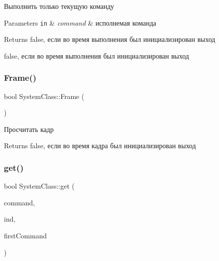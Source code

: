 Выполнить только текущую команду 


\begin{DoxyParams}[1]{Parameters}
\mbox{\tt in}  & {\em command} & исполнемая команда \\
\hline
\end{DoxyParams}
\begin{DoxyReturn}{Returns}
false, если во время выполнения был инициализирован выход 

false, если во время выполнения был инициализирован выход 
\end{DoxyReturn}
\mbox{\label{class_system_class_a19c44b1a6374453ad8735c5f880181f4}} 
\subsubsection{\texorpdfstring{Frame()}{Frame()}}
{\footnotesize\ttfamily bool System\+Class\+::\+Frame (\begin{DoxyParamCaption}{ }\end{DoxyParamCaption})\hspace{0.3cm}{\ttfamily [private]}}



Просчитать кадр 

\begin{DoxyReturn}{Returns}
false, если во время кадра был инициализирован выход 
\end{DoxyReturn}
\mbox{\label{class_system_class_a5ff4f256861285812190f780dcddff01}} 
\subsubsection{\texorpdfstring{get()}{get()}}
{\footnotesize\ttfamily bool System\+Class\+::get (\begin{DoxyParamCaption}\item[{\hyperlink{class_command_class}{Command\+Class} $\ast$}]{command,  }\item[{int}]{ind,  }\item[{int}]{first\+Command }\end{DoxyParamCaption})\hspace{0.3cm}{\ttfamily [private]}}



